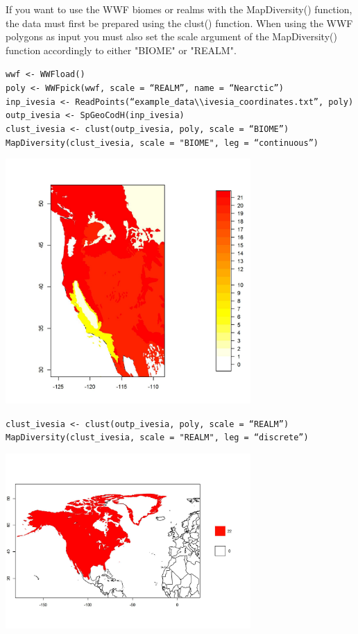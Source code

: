 \documentclass[a4paper,titlepage,11pt]{scrreprt}
\begin{document}
If you want to use the WWF  biomes or realms with the MapDiversity() function, the data must first be prepared using the clust() function. When using the WWF polygons as input you must also set the scale argument of the MapDiversity() function accordingly to either "BIOME" or "REALM". 

\texttt{wwf \textless- WWFload()}\\
\texttt{poly \textless- WWFpick(wwf, scale = ``REALM'', name  = ``Nearctic'')}\\
\texttt{inp\_ivesia  \textless- ReadPoints(``example\_data\textbackslash \textbackslash ivesia\_coordinates.txt'', poly)}\\
\texttt{outp\_ivesia \textless- SpGeoCodH(inp\_ivesia)}\\
\texttt{clust\_ivesia \textless- clust(outp\_ivesia, poly, scale = ``BIOME'')}\\
\texttt{MapDiversity(clust\_ivesia, scale = "BIOME", leg = ``continuous'')}\\

\begin{center}
\includegraphics[width=0.7\textwidth]{figures/mapdiversity_biomes.jpg}\\
\end{center}

\texttt{clust\_ivesia \textless- clust(outp\_ivesia, poly, scale = ``REALM'')}\\
\texttt{MapDiversity(clust\_ivesia, scale = "REALM", leg = ``discrete'')}\\

\begin{center}
\includegraphics[width=0.7\textwidth]{figures/mapdiversity_realms.jpg}\\
\end{center}
\end{document}
